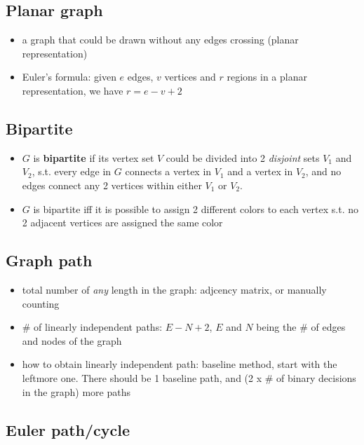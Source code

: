 \documentclass[11pt, oneside]{article}   	%
\begin{document}
\subsection{Planar graph}

\begin{itemize}
\item a graph that could be drawn without any edges crossing (planar representation)
\item Euler's formula: given $e$ edges, $v$ vertices and $r$ regions in a planar representation, we have $r = e - v + 2$
\end{itemize}

\subsection{Bipartite}

\begin{itemize}
    \item $G$ is \textbf{bipartite} if its vertex set $V$ could be divided into 2 \textit{disjoint} sets $V_1$ and $V_2$, s.t. every edge in $G$ connects a vertex in $V_1$ and a vertex in $V_2$, and no edges connect any 2 vertices within either $V_1$ or $V_2$. 
    \item $G$ is bipartite iff it is possible to assign 2 different colors to each vertex s.t. no 2 adjacent vertices are assigned the same color
\end{itemize}

\subsection{Graph path}

\begin{itemize}
    \item total number of \textit{any} length in the graph: adjcency matrix, or manually counting
    \item \# of linearly independent paths: $E-N+2$, $E$ and $N$ being the \# of edges and nodes of the graph
    \item how to obtain linearly independent path: baseline method, start with the leftmore one. There should be 1 baseline path, and (2 x \# of binary decisions in the graph) more paths
\end{itemize}

\subsection{Euler path/cycle}
\end{document}
